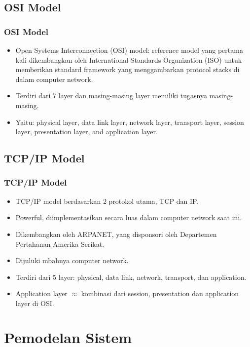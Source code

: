 \documentclass[pdflatex,compress]{beamer}
\begin{document}
\subsection{OSI Model}
\begin{frame}
	\frametitle{OSI Model}	
	\begin{itemize}
		\item  Open Systems Interconnection (OSI) model: reference model yang pertama kali dikembangkan oleh International Standards Organization (ISO) untuk memberikan standard framework yang menggambarkan protocol stacks di dalam computer network.
		\item Terdiri dari 7 layer dan masing-masing layer memiliki tugasnya masing-masing.
		\item Yaitu: physical layer, data link layer, network layer, transport layer, session layer, presentation layer, and application layer.
	\end{itemize}	
\end{frame}

\subsection{TCP/IP Model}
\begin{frame}
	\frametitle{TCP/IP Model}
	\begin{itemize}
		\item  TCP/IP model berdasarkan 2 protokol utama, TCP dan IP.
		\item Powerful, diimplementasikan secara luas dalam computer network saat ini.
		\item Dikembangkan oleh ARPANET, yang disponsori oleh Departemen Pertahanan Amerika Serikat.
		\item Dijuluki mbahnya computer network.
		\item Terdiri dari 5 layer: physical, data link, network, transport, dan application.
		\item Application layer $\approx$ kombinasi dari session, presentation dan application layer di OSI.
	\end{itemize}	
\end{frame}

\section{Pemodelan Sistem}
\end{document}

